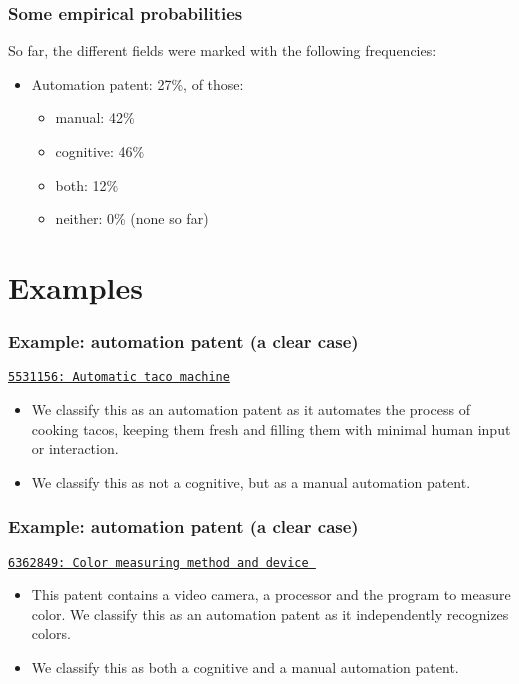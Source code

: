 \documentclass[10pt]{beamer}
\begin{document}
\begin{frame}\frametitle{Some empirical probabilities}
So far, the different fields were marked with the following frequencies:
	\begin{itemize}	
		\item Automation patent: 27\%, of those:
		\begin{itemize}
			\item manual: 42\%
			\item cognitive: 46\%
			\item both: 12\%
			\item neither: 0\% (none so far)
		\end{itemize}
	\end{itemize}
\end{frame}


\section{Examples}
\setcounter{subsection}{1} %


\begin{frame}\frametitle{Example: automation patent (a clear case)}
\href{https://www.google.de/patents/US5531156}{\texttt{5531156: Automatic taco machine}}
	\begin{itemize}	
	\item We classify this as an automation patent as it automates the process of cooking tacos, keeping them fresh and filling them with minimal human input or interaction. 
	\item We classify this as not a cognitive, but as a manual automation patent.
	\end{itemize}
\end{frame}


\begin{frame}\frametitle{Example: automation patent (a clear case)}
\href{https://www.google.de/patents/US6362849}{\texttt{6362849: Color measuring method and device }}
	\begin{itemize}	
	\item This patent contains a video camera, a processor and the program to measure color. We classify this as an automation patent as it independently recognizes colors.
	\item We classify this as both a cognitive and a manual automation patent.
	\end{itemize}
\end{frame}
\end{document}
